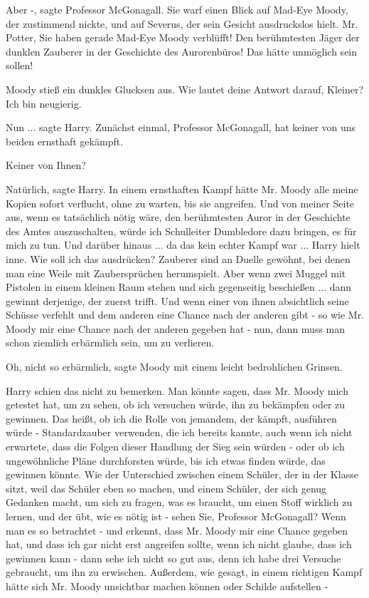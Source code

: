 \glqq{}Aber -\grqq{}, sagte Professor McGonagall. Sie warf einen Blick auf
Mad-Eye Moody, der zustimmend nickte, und auf Severus, der sein Gesicht
ausdruckslos hielt. \glqq{}Mr. Potter, Sie haben gerade Mad-Eye Moody verblüfft!
Den berühmtesten Jäger der dunklen Zauberer in der Geschichte des Aurorenbüros!
Das hätte unmöglich sein sollen!\grqq{}

Moody stieß ein dunkles Glucksen aus. \glqq{}Wie lautet deine Antwort darauf,
Kleiner? Ich bin neugierig.\grqq{}

\glqq{}Nun ...\grqq{} sagte Harry. \glqq{}Zunächst einmal, Professor McGonagall,
hat keiner von uns beiden ernsthaft gekämpft.\grqq{}

\glqq{}Keiner von Ihnen?\grqq{}

\glqq{}Natürlich\grqq{}, sagte Harry. \glqq{}In einem ernsthaften Kampf hätte Mr.
Moody alle meine Kopien sofort verflucht, ohne zu warten, bis sie angreifen. Und
von meiner Seite aus, wenn es tatsächlich nötig wäre, den berühmtesten Auror in
der Geschichte des Amtes auszuschalten, würde ich Schulleiter Dumbledore dazu
bringen, es für mich zu tun. Und darüber hinaus ... da das kein echter Kampf war
...\grqq{} Harry hielt inne. \glqq{}Wie soll ich das ausdrücken? Zauberer sind an
Duelle gewöhnt, bei denen man eine Weile mit Zaubersprüchen herumspielt. Aber
wenn zwei Muggel mit Pistolen in einem kleinen Raum stehen und sich gegenseitig
beschießen ... dann gewinnt derjenige, der zuerst trifft. Und wenn einer von
ihnen absichtlich seine Schüsse verfehlt und dem anderen eine Chance nach der
anderen gibt - so wie Mr. Moody mir eine Chance nach der anderen gegeben hat -
nun, dann muss man schon ziemlich erbärmlich sein, um zu verlieren.\grqq{}

\glqq{}Oh, nicht so erbärmlich\grqq{}, sagte Moody mit einem leicht bedrohlichen
Grinsen.

Harry schien das nicht zu bemerken. \glqq{}Man könnte sagen, dass Mr. Moody mich
getestet hat, um zu sehen, ob ich versuchen würde, ihn zu bekämpfen oder zu
gewinnen. Das heißt, ob ich die Rolle von jemandem, der kämpft, ausführen würde
- Standardzauber verwenden, die ich bereits kannte, auch wenn ich nicht
erwartete, dass die Folgen dieser Handlung der Sieg sein würden - oder ob ich
ungewöhnliche Pläne durchforsten würde, bis ich etwas finden würde, das gewinnen
könnte. Wie der Unterschied zwischen einem Schüler, der in der Klasse sitzt,
weil das Schüler eben so machen, und einem Schüler, der sich genug Gedanken
macht, um sich zu fragen, was es braucht, um einen Stoff wirklich zu lernen, und
der übt, wie es nötig ist - sehen Sie, Professor McGonagall? Wenn man es so
betrachtet - und erkennt, dass Mr. Moody mir eine Chance gegeben hat, und dass
ich gar nicht erst angreifen sollte, wenn ich nicht glaube, dass ich gewinnen
kann - dann sehe ich nicht so gut aus, denn ich habe drei Versuche gebraucht, um
ihn zu erwischen. Außerdem, wie gesagt, in einem richtigen Kampf hätte sich Mr.
Moody unsichtbar machen können oder Schilde aufstellen -\grqq{}

